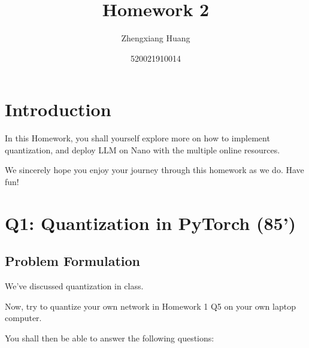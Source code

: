 \documentclass[12pt,a4paper]{article}
\theoremstyle{definition}
\begin{document}
\title{\textbf{Homework 2}}
\author{Zhengxiang Huang}
\date{520021910014}
\maketitle

\tableofcontents
\newpage

\section{Introduction}
In this Homework, you shall yourself explore more on how to implement quantization, 
and deploy LLM on Nano with the multiple online resources. 

We sincerely hope you enjoy your journey through this homework as we do. Have fun!

\section{Q1: Quantization in PyTorch (85')}


\subsection{Problem Formulation}
We've discussed quantization in class. 

Now, try to quantize your own network in Homework 1 Q5 on your own laptop computer.

You shall then be able to answer the following questions:
\end{document}
